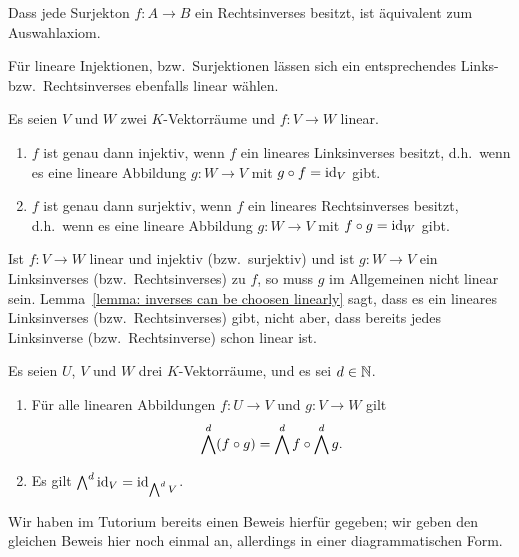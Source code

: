 \begin{remark}
  Dass jede Surjekton $f \colon A \to B$ ein Rechtsinverses besitzt, ist äquivalent zum Auswahlaxiom.
\end{remark}

Für lineare Injektionen, bzw.\ Surjektionen lässen sich ein entsprechendes Links- bzw.\ Rechtsinverses ebenfalls linear wählen.

\begin{lemma}
  \label{lemma: inverses can be choosen linearly}
  Es seien $V$ und $W$ zwei $K$-Vektorräume und $f \colon V \to W$ linear.
  \begin{enumerate}
    \item
      $f$ ist genau dann injektiv, wenn $f$ ein lineares Linksinverses besitzt, d.h.\ wenn es eine lineare Abbildung $g \colon W \to V$ mit $g \circ f = \operatorname{id}_V$ gibt.
    \item
      $f$ ist genau dann surjektiv, wenn $f$ ein lineares Rechtsinverses besitzt, d.h.\ wenn es eine lineare Abbildung $g \colon W \to V$ mit $f \circ g = \operatorname{id}_W$ gibt.
  \end{enumerate}
\end{lemma}

\begin{warning}
  Ist $f \colon V \to W$ linear und injektiv (bzw.\ surjektiv) und ist $g \colon W \to V$ ein Linksinverses (bzw.\ Rechtsinverses) zu $f$, so muss $g$ im Allgemeinen nicht linear sein.
  Lemma~\ref{lemma: inverses can be choosen linearly} sagt, dass es ein lineares Linksinverses (bzw.\ Rechtsinverses) gibt, nicht aber, dass bereits jedes Linksinverse (bzw.\ Rechtsinverse) schon linear ist.
\end{warning}

\begin{proposition}
  \label{proposition: functoriality of exterior power}
  Es seien $U$, $V$ und $W$ drei $K$-Vektorräume, und es sei $d \in \mathbb{N}$.
  \begin{enumerate}
    \item
      Für alle linearen Abbildungen $f \colon U \to V$ und $g \colon V \to W$ gilt
      \[
          \bigwedge^{d} (f \circ g)
        = \bigwedge^{d} f \circ \bigwedge^{d} g.
      \]
    \item
      Es gilt $\bigwedge^{d}  \operatorname{id}_V = \operatorname{id}_{\bigwedge^{d} V}$.
  \end{enumerate}
\end{proposition}

Wir haben im Tutorium bereits einen Beweis hierfür gegeben;
wir geben den gleichen Beweis hier noch einmal an, allerdings in einer diagrammatischen Form.

